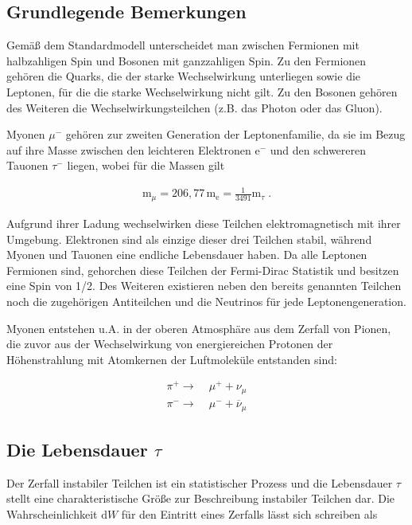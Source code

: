 \subsection{Grundlegende Bemerkungen}
Gemäß dem Standardmodell unterscheidet man zwischen Fermionen mit halbzahligen Spin und Bosonen mit ganzzahligen Spin. Zu den Fermionen gehören die Quarks, die der starke Wechselwirkung unterliegen sowie die Leptonen, für die die starke Wechselwirkung nicht gilt. Zu den Bosonen gehören des Weiteren die Wechselwirkungsteilchen (z.B. das Photon oder das Gluon).

Myonen $\mu^-$ gehören zur zweiten Generation der Leptonenfamilie, da sie im Bezug auf ihre Masse zwischen den leichteren Elektronen $\textrm{e}^-$ und den schwereren Tauonen $\tau^-$ liegen, wobei für die Massen gilt

\begin{align}
\textrm{m}_\mu = 206,77\, \textrm{m}_{\textrm{e}} = \frac{1}{3491}\textrm{m}_{\tau}\;.
\end{align}

Aufgrund ihrer Ladung wechselwirken diese Teilchen elektromagnetisch mit ihrer Umgebung. Elektronen sind als einzige dieser drei Teilchen stabil, während Myonen und Tauonen eine endliche Lebensdauer haben. Da alle Leptonen Fermionen sind, gehorchen diese Teilchen der Fermi-Dirac Statistik und besitzen eine Spin von 1/2. Des Weiteren existieren neben den bereits genannten Teilchen noch die zugehörigen Antiteilchen und die Neutrinos für jede Leptonengeneration.

Myonen entstehen u.A. in der oberen Atmosphäre aus dem Zerfall von Pionen, die zuvor aus der Wechselwirkung von energiereichen Protonen der Höhenstrahlung mit Atomkernen der Luftmoleküle entstanden sind:

\begin{align}
\pi^+ \longrightarrow &\; \mu^+ + \nu_\mu \\
\pi^- \longrightarrow &\; \mu^- + \overline{\nu}_\mu 
\end{align}

\subsection{Die Lebensdauer $\tau$}
Der Zerfall instabiler Teilchen ist ein statistischer Prozess und die Lebensdauer $\tau$ stellt eine charakteristische Größe zur Beschreibung instabiler Teilchen dar. Die Wahrscheinlichkeit $\textrm{d}W$ für den Eintritt eines Zerfalls lässt sich schreiben als
 
